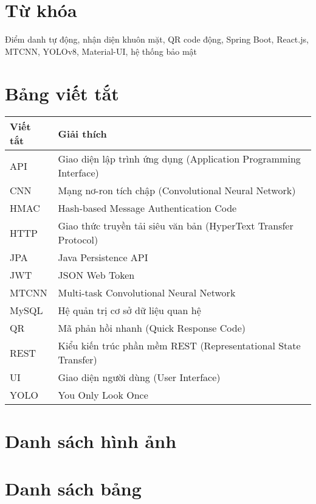 \documentclass[12pt,a4paper]{report}
\begin{document}
\chapter*{Từ khóa}
Điểm danh tự động, nhận diện khuôn mặt, QR code động, Spring Boot, React.js, MTCNN, YOLOv8, Material-UI, hệ thống bảo mật

\chapter*{Bảng viết tắt}
\begin{longtable}{|l|p{10cm}|}
\hline
\textbf{Viết tắt} & \textbf{Giải thích} \\
\hline
API & Giao diện lập trình ứng dụng (Application Programming Interface) \\
CNN & Mạng nơ-ron tích chập (Convolutional Neural Network) \\
HMAC & Hash-based Message Authentication Code \\
HTTP & Giao thức truyền tải siêu văn bản (HyperText Transfer Protocol) \\
JPA & Java Persistence API \\
JWT & JSON Web Token \\
MTCNN & Multi-task Convolutional Neural Network \\
MySQL & Hệ quản trị cơ sở dữ liệu quan hệ \\
QR & Mã phản hồi nhanh (Quick Response Code) \\
REST & Kiểu kiến trúc phần mềm REST (Representational State Transfer) \\
UI & Giao diện người dùng (User Interface) \\
YOLO & You Only Look Once \\
\hline
\end{longtable}

\chapter*{Danh sách hình ảnh}
\listoffigures

\chapter*{Danh sách bảng}
\listoftables
\end{document}
